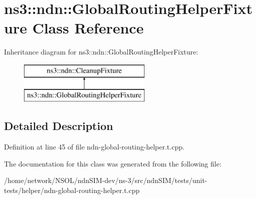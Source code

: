 \hypertarget{classns3_1_1ndn_1_1GlobalRoutingHelperFixture}{}\section{ns3\+:\+:ndn\+:\+:Global\+Routing\+Helper\+Fixture Class Reference}
\label{classns3_1_1ndn_1_1GlobalRoutingHelperFixture}
Inheritance diagram for ns3\+:\+:ndn\+:\+:Global\+Routing\+Helper\+Fixture\+:\begin{figure}[H]
\begin{center}
\leavevmode
\includegraphics[height=2.000000cm]{classns3_1_1ndn_1_1GlobalRoutingHelperFixture}
\end{center}
\end{figure}


\subsection{Detailed Description}


Definition at line 45 of file ndn-\/global-\/routing-\/helper.\+t.\+cpp.



The documentation for this class was generated from the following file\+:\begin{DoxyCompactItemize}
\item 
/home/network/\+N\+S\+O\+L/ndn\+S\+I\+M-\/dev/ns-\/3/src/ndn\+S\+I\+M/tests/unit-\/tests/helper/ndn-\/global-\/routing-\/helper.\+t.\+cpp\end{DoxyCompactItemize}
